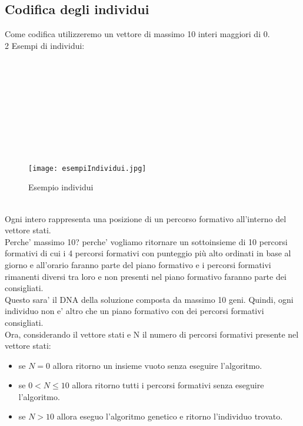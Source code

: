 \documentclass[10pt,a4paper]{article}
\begin{document}
    \subsection{Codifica degli individui}
      \label{codificaDegliIndividuiSubsection}
      Come codifica utilizzeremo un vettore di massimo 10 interi maggiori di 0.\\
      2 Esempi di individui:
      \\\\\\\\\\\\\\\\\\\\
      \begin{figure}[h!]
        \centering
        \caption{Esempio individui}
        \texttt{[image: esempiIndividui.jpg]}
        \label{esempioIndividui}
      \end{figure}\\
      Ogni intero rappresenta una posizione di un percorso formativo all'interno del vettore stati.\\
      Perche' massimo 10? perche' vogliamo ritornare un sottoinsieme di 10 percorsi formativi di cui i 
      4 percorsi formativi con punteggio più alto ordinati in base al giorno e all'orario faranno parte 
      del piano formativo e i percorsi formativi rimanenti diversi tra loro e non presenti 
      nel piano formativo faranno parte dei consigliati.\\
      Questo sara' il DNA della soluzione composta da massimo 10 geni. Quindi, ogni individuo non e' 
      altro che un piano formativo con dei percorsi formativi consigliati.\\
      Ora, considerando il vettore stati e N il numero di percorsi formativi presente 
      nel vettore stati:\\
      \begin{itemize}
        \item se $ N = 0 $ allora ritorno un insieme vuoto senza eseguire l'algoritmo.
        \item se $ 0 < N \leq 10 $ allora ritorno tutti i percorsi formativi senza eseguire 
        l'algoritmo.
        \item se $ N > 10 $ allora eseguo l'algoritmo genetico e ritorno l'individuo trovato.
      \end{itemize}
      
\end{document}
